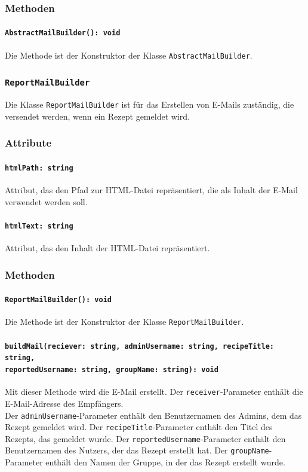 \documentclass{entwurfsheft}
\begin{document}
\begin{sloppypar}
\subsubsection*{Methoden}
\paragraph{\texttt{AbstractMailBuilder(): void}}
Die Methode ist der Konstruktor der Klasse \texttt{AbstractMailBuilder}.

\subsubsection{\texttt{ReportMailBuilder}}\label{sec:ReportMailBuilder}
Die Klasse \texttt{ReportMailBuilder} ist für das Erstellen von E-Mails zuständig, die versendet werden, wenn ein Rezept gemeldet wird.
\subsubsection*{Attribute}
\paragraph{\texttt{htmlPath: string}}
Attribut, das den Pfad zur HTML-Datei repräsentiert, die als Inhalt der E-Mail verwendet werden soll.
\paragraph{\texttt{htmlText: string}}
Attribut, das den Inhalt der HTML-Datei repräsentiert.
\subsubsection*{Methoden}
\paragraph{\texttt{ReportMailBuilder(): void}}
Die Methode ist der Konstruktor der Klasse \texttt{ReportMailBuilder}.
\paragraph{\texttt{buildMail(reciever: string, adminUsername: string, recipeTitle: string, \\reportedUsername: string, groupName: string): void}}
Mit dieser Methode wird die E-Mail erstellt. Der \texttt{receiver}-Parameter enthält die E-Mail-Adresse des Empfängers. \\ Der \texttt{adminUsername}-Parameter enthält den Benutzernamen des Admins, dem das Rezept gemeldet wird. Der \texttt{recipeTitle}-Parameter enthält den Titel des Rezepts, das gemeldet wurde. Der \texttt{reportedUsername}-Parameter enthält den Benutzernamen des Nutzers, der das Rezept erstellt hat. Der \texttt{groupName}-Parameter enthält den Namen der Gruppe, in der das Rezept erstellt wurde.


\end{sloppypar}
\end{document}
